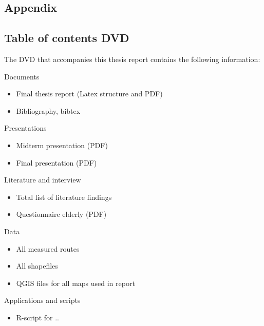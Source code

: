 \begin{appendix}
\chapter{Appendix}

\section{Table of contents DVD}
The DVD that accompanies this thesis report contains the following information:

Documents
\begin{itemize}
	\item Final thesis report (Latex structure and PDF)
	\item Bibliography, bibtex
\end{itemize}

Presentations
\begin{itemize}
	\item Midterm presentation (PDF)
	\item Final presentation (PDF)
\end{itemize}

Literature and interview
\begin{itemize}
	\item Total list of literature findings 
	\item Questionnaire elderly (PDF)
\end{itemize}

Data
\begin{itemize}
 	\item All measured routes
 	\item All shapefiles 
 	\item QGIS files for all maps used in report
\end{itemize}

Applications and scripts
\begin{itemize}
	\item R-script for  ..
\end{itemize}	


\clearpage


\end{appendix}
